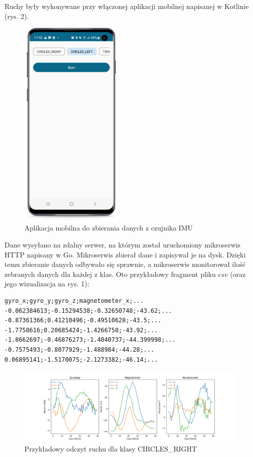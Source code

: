 \documentclass[10pt]{article}
\begin{document}
Ruchy były wykonywane przy włączonej aplikacji mobilnej napisanej w Kotlinie (rys. 2).

\begin{figure}[h]
\label{fig:screenshot}
\includegraphics[width=5cm]{s1.png}
\centering
\caption{Aplikacja mobilna do zbierania danych z czujnika IMU}
\end{figure}

Dane wysyłano na zdalny serwer, na którym został uruchomiony mikroserwis HTTP napisany w Go. Mikroserwis zbierał dane i zapisywał je na dysk. Dzięki temu zbieranie danych odbywało się sprawnie, a mikroserwis monitorował ilość zebranych danych dla każdej z klas. Oto przykładowy fragment pliku $csv$ (oraz jego wizualizacja na rys. 1):

\begin{verbatim}  
gyro_x;gyro_y;gyro_z;magnetometer_x;...
-0.062384613;-0.15294538;-0.32650748;-43.62;...
-0.87361366;0.41210496;-0.49510628;-43.5;...
-1.7758616;0.20685424;-1.4266758;-43.92;...
-1.8662697;-0.46876273;-1.4040737;-44.399998;...
-0.7575493;-0.8077929;-1.488984;-44.28;...
0.06895141;-1.5170075;-2.1273382;-46.14;...
\end{verbatim}


\begin{figure}[H]
  \includegraphics[width=16cm]{sample.png}
  \centering
  \caption{Przykładowy odczyt ruchu dla klasy CIRCLES\_RIGHT}
\end{figure}
\end{document}

